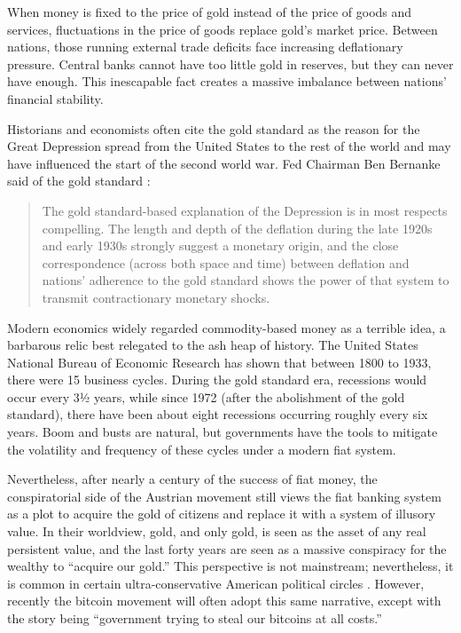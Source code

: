 When money is fixed to the price of gold instead of the price of goods and
services, fluctuations in the price of goods replace gold's market price.
Between nations, those running external trade deficits face increasing
deflationary pressure. Central banks cannot have too little gold in reserves,
but they can never have enough. This inescapable fact creates a massive
imbalance between nations' financial stability. \cite{roche_understanding_2011}

Historians and economists often cite the gold standard as the reason for the
Great Depression spread from the United States to the rest of the world and may
have influenced the start of the second world war. Fed Chairman Ben Bernanke
said of the gold standard \cite{bernanke_essays_2004}:

\begin{quote}
The gold standard-based explanation of the Depression is in most
respects compelling. The length and depth of the deflation during the
late 1920s and early 1930s strongly suggest a monetary origin, and the
close correspondence (across both space and time) between deflation and
nations' adherence to the gold standard shows the power of that system
to transmit contractionary monetary shocks.
\end{quote}

Modern economics widely regarded commodity-based money as a terrible idea, a
barbarous relic best relegated to the ash heap of history.
\cite{shea_survey_2012} The United States National Bureau of Economic Research
has shown that between 1800 to 1933, there were 15 business cycles. During the
gold standard era, recessions would occur every 3½ years, while since 1972
(after the abolishment of the gold standard), there have been about eight
recessions occurring roughly every six years. Boom and busts are natural, but
governments have the tools to mitigate the volatility and frequency of these
cycles under a modern fiat system.  \cite{mcleay_money_2014}

Nevertheless, after nearly a century of the success of fiat money, the
conspiratorial side of the Austrian movement still views the fiat banking system
as a plot to acquire the gold of citizens and replace it with a system of
illusory value. In their worldview, gold, and only gold, is seen as the asset of
any real persistent value, and the last forty years are seen as a massive
conspiracy for the wealthy to ``acquire our gold.'' This perspective is not
mainstream; nevertheless, it is common in certain ultra-conservative American
political circles \cite{bartlett_forget_2017}. However, recently the bitcoin
movement will often adopt this same narrative, except with the story being
``government trying to steal our bitcoins at all costs.''

